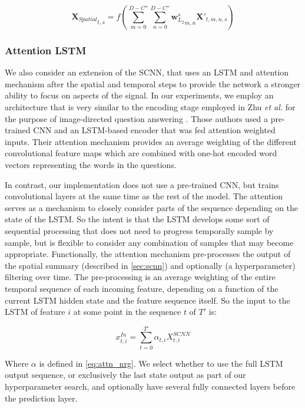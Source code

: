 \documentclass[utf8]{frontiersSCNS} %
\begin{document}
\begin{equation} \label{eq:scnn_s2}
  {\boldsymbol{X}_{Spatial}}_{t, s} = f(\sum_{m=0}^{D-C''}\sum_{n=0}^{D-C''}{\boldsymbol{w}_{L_2}^s}_{m,n} \boldsymbol{X'}_{t, m, n, s})
\end{equation}

\subsubsection{Attention LSTM}

We also consider an extension of the SCNN, that uses an LSTM and attention mechanism after the spatial and temporal steps to provide the network a stronger ability to focus on aspects of the signal. In our experiments, we employ an architecture that is very similar to the encoding stage employed in Zhu {\em et al.} for the purpose of image-directed question answering \cite{Zhu}. Those authors used a pre-trained CNN and an LSTM-based encoder that was fed attention weighted inputs. Their attention mechanism provides an average weighting of the different convolutional feature maps which are combined with one-hot encoded word vectors representing the words in the questions.

In contrast, our implementation does not use a pre-trained CNN, but trains convolutional layers at the same time as the rest of the model. The attention serves as a mechanism to closely consider parts of the sequence depending on the state of the LSTM. So the intent is that the LSTM develops some sort of sequential processing that does not need to progress temporally sample by sample, but is flexible to consider any combination of samples that may become appropriate. Functionally, the attention mechanism pre-processes the output of the spatial summary (described in \ref{sec:scnn}) and optionally (a hyperparameter) filtering over time. The pre-processing is an average weighting of the entire temporal sequence of each incoming feature, depending on a function of the current LSTM hidden state and the feature sequence itself. So the input to the LSTM of feature $i$ at some point in the sequence $t$ of $T'$ is:

\begin{equation}
  x_{t,i}^{In} = \sum_{t=0}^{T'} \alpha_{t,i} X_{t,i}^{SCNN}
\end{equation}

Where $\alpha$ is defined in \ref{eq:attn_nrg}. We select whether to use the full LSTM output sequence, or exclusively the last state output as part of our hyperparameter search, and optionally have several fully connected layers before the prediction layer.
\end{document}
